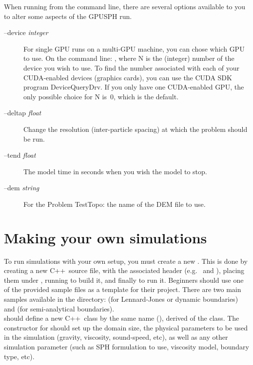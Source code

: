\documentclass[12pt]{memoir}
\newcommand{\cpp}{{\sffamily C\ttfamily++}}
\begin{document}
When running from the command line, there are several options available
to you to alter some aspects of the GPUSPH run.

\begin{description}
\item[--device \emph{integer}]
For single GPU runs on a multi-GPU machine, you can chose which GPU to
use. On the command line: , where N is the
(integer) number of the device you wish to use. To find the number
associated with each of your CUDA-enabled devices (graphics cards), you
can use the CUDA SDK program DeviceQueryDrv. If you only have one
CUDA-enabled GPU, the only possible choice for N is~0, which is the
default.
\item[--deltap \emph{float}]
Change the resolution (inter-particle spacing) at which the problem
should be run.
\item[--tend \emph{float}]
The model time in seconds when you wish the model to stop.
\item[--dem \emph{string}]
For the Problem TestTopo: the name of the DEM file to use.
\end{description}


\chapter{Making your own simulations}

To run simulations with your own setup, you must create a new
. This is done by creating a new \cpp\ source file, with
the associated header (e.g.\  and ),
placing them under , running  to
build it, and finally  to run it. Beginners should use one
of the provided sample files as a template for their project.
There are two main samples available in the  directory: 
 (for Lennard-Jones or dynamic boundaries) 
and  (for semi-analytical boundaries).\\

 should define a new \cpp\ class by the same name
(), derived of the  class. The constructor
for  should set up the domain size, the physical
parameters to be used in the simulation (gravity, viscosity,
sound-speed, etc), as well as any other simulation parameter (such as
SPH formulation to use, viscosity model, boundary type, etc).
\end{document}
